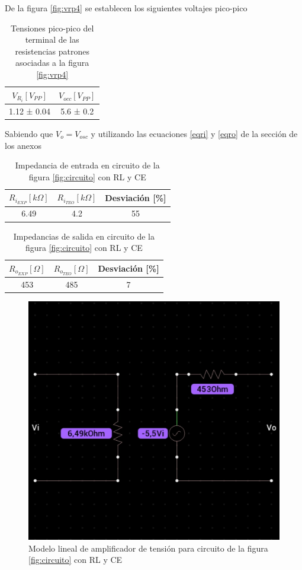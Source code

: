 \documentclass[12pt, a4paper]{article}
\begin{document}
    De la figura \ref{fig:vrp4} se establecen los siguientes voltajes pico-pico

    \begin{table}[h!]
        \centering
        \caption{Tensiones pico-pico del terminal de las resistencias patrones asociadas a la figura \ref{fig:vrp4}}
        \label{tab:vrp4}
        \begin{tabular}{|c|c|} \hline
            $V_{R_i} [V_{PP}]$  &   $V_{occ} [V_{PP}]$  \\ \hline
            1.12 ± 0.04         &   5.6 ± 0.2    \\ \hline
        \end{tabular}
    \end{table}

    Sabiendo que $V_o = V_{osc}$ y utilizando las ecuaciones \eqref{eqri} y \eqref{eqro} de la sección de los anexos

    \begin{table}[h!]
        \centering
        \caption{Impedancia de entrada en circuito de la figura \ref{fig:circuito} con RL y CE}
        \label{tab:rpi4}
        \begin{tabular}{|c|c|c|} \hline
            $R_{i_{EXP}} [k\Omega]$  &   $R_{i_{TEO}} [k\Omega]$ & Desviación [\%]  \\ \hline
            6.49         &   4.2   & 55 \\ \hline
        \end{tabular}
    \end{table}

    \begin{table}[h!]
        \centering
        \caption{Impedancias de salida en circuito de la figura \ref{fig:circuito} con RL y CE}
        \label{tab:rpo4}
        \begin{tabular}{|c|c|c|} \hline
            $R_{o_{EXP}} [\Omega]$  &   $R_{o_{TEO}} [\Omega]$ & Desviación [\%]  \\ \hline
            453         &   485   & 7 \\ \hline
        \end{tabular}
    \end{table}

    \newpage

    \begin{figure}[h!]
        \centering
        \includegraphics[height=5cm\textwidth]{ma4.jpg}
        \caption{Modelo lineal de amplificador de tensión para circuito de la figura \ref{fig:circuito} con RL y CE}
        \label{fig:ma4}
    \end{figure}
\end{document}
